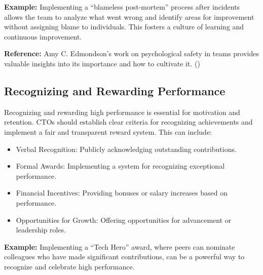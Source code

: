 \textbf{Example:} Implementing a ``blameless post-mortem'' process after incidents allows the team to analyze what went wrong and identify areas for improvement without assigning blame to individuals. This fosters a culture of learning and continuous improvement.

\textbf{Reference:} Amy C. Edmondson's work on psychological safety in teams provides valuable insights into its importance and how to cultivate it. (\cite{edmondson1999})

\subsection{Recognizing and Rewarding Performance}

Recognizing and rewarding high performance is essential for motivation and retention. CTOs should establish clear criteria for recognizing achievements and implement a fair and transparent reward system. This can include:
\begin{itemize}
    \item Verbal Recognition: Publicly acknowledging outstanding contributions.
    \item Formal Awards: Implementing a system for recognizing exceptional performance.
    \item Financial Incentives: Providing bonuses or salary increases based on performance.
    \item Opportunities for Growth: Offering opportunities for advancement or leadership roles.
\end{itemize}

\textbf{Example:} Implementing a ``Tech Hero'' award, where peers can nominate colleagues who have made significant contributions, can be a powerful way to recognize and celebrate high performance.

